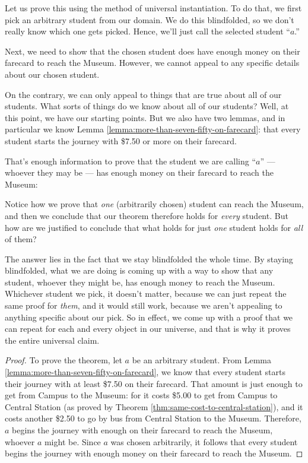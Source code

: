 \documentclass[../../../main.tex]{subfiles}
\begin{document}
Let us prove this using the method of universal instantiation. To do that, we first pick an arbitrary student from our domain. We do this blindfolded, so we don't really know which one gets picked. Hence, we'll just call the selected student ``$a$.''

Next, we need to show that the chosen student does have enough money on their farecard to reach the Museum. However, we cannot appeal to any specific details about our chosen student.

On the contrary, we can only appeal to things that are true about all of our students. What sorts of things do we know about all of our students? Well, at this point, we have our starting points. But we also have two lemmas, and in particular we know Lemma \ref{lemma:more-than-seven-fifty-on-farecard}: that every student starts the journey with \$7.50 or more on their farecard.

That's enough information to prove that the student we are calling ``$a$'' --- whoever they may be --- has enough money on their farecard to reach the Museum:

\begin{aside}
  \begin{remark}
    Notice how we prove that \emph{one} (arbitrarily chosen) student can reach the Museum, and then we conclude that our theorem therefore holds for \emph{every} student. But how are we justified to conclude that what holds for just \emph{one} student holds for \emph{all} of them? 

    The answer lies in the fact that we stay blindfolded the whole time. By staying blindfolded, what we are doing is coming up with a way to show that any student, whoever they might be, has enough money to reach the Museum. Whichever student we pick, it doesn't matter, because we can just repeat the same proof for \emph{them}, and it would still work, because we aren't appealing to anything specific about our pick. So in effect, we come up with a proof that we can repeat for each and every object in our universe, and that is why it proves the entire universal claim.
  \end{remark}
\end{aside}

\begin{framed}
  \begin{proof}
    To prove the theorem, let $a$ be an arbitrary student. From Lemma \ref{lemma:more-than-seven-fifty-on-farecard}, we know that every student starts their journey with at least \$7.50 on their farecard. That amount is just enough to get from Campus to the Museum: for it costs \$5.00 to get from Campus to Central Station (as proved by Theorem \ref{thm:same-cost-to-central-station}), and it costs another \$2.50 to go by bus from Central Station to the Museum. Therefore, $a$ begins the journey with enough on their farecard to reach the Museum, whoever $a$ might be. Since $a$ was chosen arbitrarily, it follows that every student begins the journey with enough money on their farecard to reach the Museum.
  \end{proof}
\end{framed}
\end{document}
